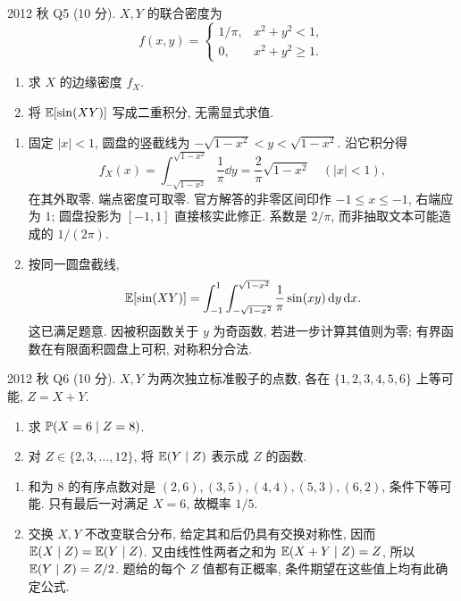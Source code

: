 \begin{exercise}\label{ex:fe2012q5}
2012 秋 Q5 (10 分). $X,Y$ 的联合密度为
\[
 f(x,y)=\begin{cases}1/\pi,&x^2+y^2<1,\\0,&x^2+y^2\ge1.\end{cases}
\]
\begin{enumerate}[label=(\alph*)]
\item\label{ex:fe2012q5-a} 求 $X$ 的边缘密度 $f_X$.
\item\label{ex:fe2012q5-b} 将 $\mathbb E[\sin(XY)]$ 写成二重积分, 无需显式求值.
\end{enumerate}
\end{exercise}
\begin{solution}
\begin{enumerate}[label=(\alph*)]
\item\label{sol:fe2012q5-a} 固定 $|x|<1$, 圆盘的竖截线为 $-\sqrt{1-x^2}<y<\sqrt{1-x^2}$. 沿它积分得
\[
 f_X(x)=\int_{-\sqrt{1-x^2}}^{\sqrt{1-x^2}}\frac1\pi\dd y
 =\frac2\pi\sqrt{1-x^2}\quad(|x|<1),
\]
在其外取零. 端点密度可取零. 官方解答的非零区间印作 $-1\le x\le-1$, 右端应为 $1$; 圆盘投影为 $[-1,1]$ 直接核实此修正. 系数是 $2/\pi$, 而非抽取文本可能造成的 $1/(2\pi)$.
\item\label{sol:fe2012q5-b} 按同一圆盘截线,
\[
 \mathbb E[\sin(XY)]=\int_{-1}^1\int_{-\sqrt{1-x^2}}^{\sqrt{1-x^2}}
 \frac1\pi\sin(xy)\,\mathrm d y\,\mathrm d x.
\]
这已满足题意. 因被积函数关于 $y$ 为奇函数, 若进一步计算其值则为零; 有界函数在有限面积圆盘上可积, 对称积分合法.
\end{enumerate}
\end{solution}

\begin{exercise}\label{ex:fe2012q6}
2012 秋 Q6 (10 分). $X,Y$ 为两次独立标准骰子的点数, 各在 $\{1,2,3,4,5,6\}$ 上等可能, $Z=X+Y$.
\begin{enumerate}[label=(\alph*)]
\item\label{ex:fe2012q6-a} 求 $\mathbb P(X=6\mid Z=8)$.
\item\label{ex:fe2012q6-b} 对 $Z\in\{2,3,\ldots,12\}$, 将 $\mathbb E(Y\mid Z)$ 表示成 $Z$ 的函数.
\end{enumerate}
\end{exercise}
\begin{solution}
\begin{enumerate}[label=(\alph*)]
\item\label{sol:fe2012q6-a} 和为 $8$ 的有序点数对是 $(2,6),(3,5),(4,4),(5,3),(6,2)$, 条件下等可能. 只有最后一对满足 $X=6$, 故概率 $1/5$.
\item\label{sol:fe2012q6-b} 交换 $X,Y$ 不改变联合分布, 给定其和后仍具有交换对称性, 因而 $\mathbb E(X\mid Z)=\mathbb E(Y\mid Z)$. 又由线性性两者之和为 $\mathbb E(X+Y\mid Z)=Z$, 所以 $\mathbb E(Y\mid Z)=Z/2$. 题给的每个 $Z$ 值都有正概率, 条件期望在这些值上均有此确定公式.
\end{enumerate}
\end{solution}

